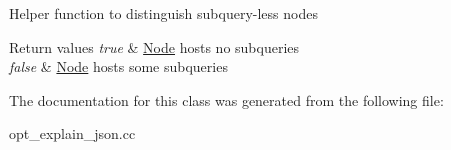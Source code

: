 Helper function to distinguish subquery-\/less nodes


\begin{DoxyRetVals}{Return values}
{\em true} & \mbox{\hyperlink{classNode}{Node}} hosts no subqueries \\
\hline
{\em false} & \mbox{\hyperlink{classNode}{Node}} hosts some subqueries \\
\hline
\end{DoxyRetVals}


The documentation for this class was generated from the following file\+:\begin{DoxyCompactItemize}
\item 
opt\+\_\+explain\+\_\+json.\+cc\end{DoxyCompactItemize}
